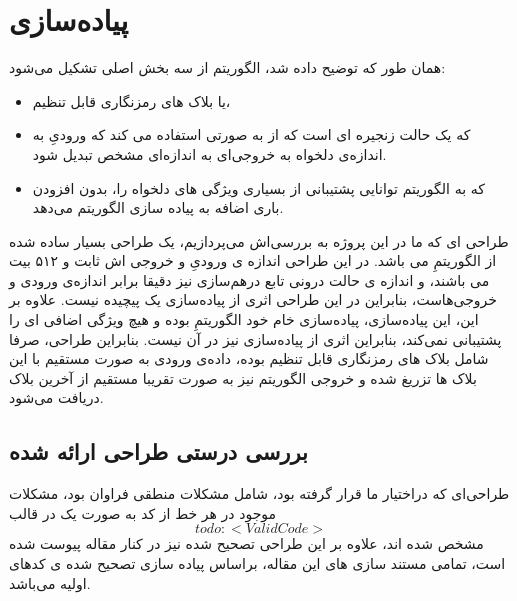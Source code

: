 \pagebreak
\section{
	پیاده‌سازی
}
همان طور که توضیح داده شد، الگوریتم 
از سه بخش اصلی تشکیل می‌شود:
\begin{itemize}
	\item 
	یا بلاک های رمزنگاری قابل تنظیم،
	\item
که یک حالت زنجیره ای است که از
به صورتی استفاده می کند که ورودیِ ‌به اندازه‌ی دلخواه به خروجی‌ای به اندازه‌ای مشخص تبدیل شود.
\item
\textbf{ } 
که به الگوریتم توانایی پشتیبانی از بسیاری ویژگی های دلخواه را، بدون افزودن باری اضافه به پیاده سازی الگوریتم می‌دهد.

\end{itemize}

طراحی ای که ما در این پروژه به بررسی‌اش می‌پردازیم، یک طراحی بسیار ساده شده از الگوریتمِ
می باشد. در این طراحی اندازه ی ورودیِ و خروجی اش ثابت و ۵۱۲ بیت می باشند، و اندازه ی حالت درونی تابع درهم‌سازی نیز دقیقا برابر اندازه‌ی ورودی و خروجی‌هاست، بنابراین در این طراحی اثری از پیاده‌سازی یک 
 پیچیده نیست. علاوه‌ بر این، این پیاده‌سازی، پیاده‌سازی خام خود الگوریتمِ
 بوده و هیچ ویژگی اضافی ای را پشتیبانی نمی‌کند، بنابراین اثری از پیاده‌سازی 
نیز در آن نیست. بنابراین طراحی، صرفا شامل بلاک های رمزنگاری قابل تنظیم بوده، داده‌ی ورودی به صورت مستقیم با این بلاک ها تزریغ شده و خروجی الگوریتم نیز به صورت تقریبا مستقیم از آخرین بلاک دریافت می‌شود.

\subsection{
	بررسی درستی طراحی ارائه شده
}
طراحی‌ای که دراختیار ما قرار گرفته بود، شامل مشکلات منطقی فراوان بود، مشکلات موجود در هر خط از کد 
به صورت یک 
در قالب 
$$todo: <Valid Code>$$
مشخص شده اند، علاوه بر این طراحی تصحیح شده نیز در کنار مقاله پیوست شده است، تمامی مستند سازی های این مقاله، براساس پیاده سازی تصحیح شده ی کدهای اولیه می‌باشد.
